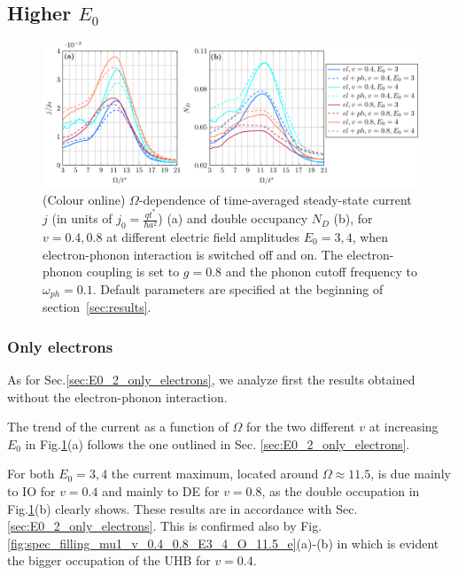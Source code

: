 \documentclass[aps,prb,groupedaddress,showpacs,twocolumn,superscriptaddress,10pt]{revtex4-2}
\begin{document}
\newpage

\subsection{Higher $E_0$}
\label{sec:higher_E0}


\begin{figure}[ht] 
\includegraphics[width=\textwidth]{./figures_Paper1/j_vs_omega_mu1_v_0.4_0.8_eph_E0_3_4.pdf}
\caption{(Colour online) $\Omega$-dependence of time-averaged steady-state current $j$ (in units of $j_0=\frac{qt^*}{\hbar a^2}$) (a) and double occupancy $N_D$ (b), for $v=0.4,0.8$ at different electric field amplitudes $E_0=3,4$, when electron-phonon interaction is switched off and on. The electron-phonon coupling is set to $g=0.8$ and the phonon cutoff frequency to $\omega_{ph}=0.1$. Default parameters are specified at the beginning of section~\ref{sec:results}.} 
\label{fig:j_vs_omega_mu1_v_0.4_0.8_eph_E0_3_4}
\end{figure}     

\subsubsection{Only electrons}
\label{sec:higher_E0_only_electrons} 
 
As for Sec.\ref{sec:E0_2_only_electrons}, we analyze first the results obtained without the electron-phonon interaction.

The trend of the current as a function of $\Omega$ for the two different $v$ at increasing $E_0$ in Fig.\ref{fig:j_vs_omega_mu1_v_0.4_0.8_eph_E0_3_4}(a) follows the one outlined in Sec. \ref{sec:E0_2_only_electrons}. 

For both $E_0=3,4$ the current maximum, located around $\Omega\approx11.5$, is due mainly to IO for $v=0.4$ and mainly to DE for $v=0.8$, as the double occupation in Fig.\ref{fig:j_vs_omega_mu1_v_0.4_0.8_eph_E0_3_4}(b) clearly shows. These results are in accordance with Sec.\ref{sec:E0_2_only_electrons}. This is confirmed also by Fig.\ref{fig:spec_filling_mu1_v_0.4_0.8_E3_4_O_11.5_e}(a)-(b) in which is evident the bigger occupation of the UHB for $v=0.4$. 
 
\end{document}

